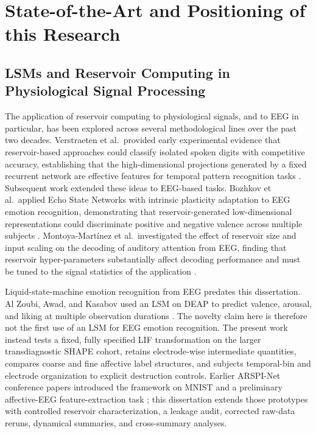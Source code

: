 \section{State-of-the-Art and Positioning of this Research}
\label{sec:state_of_art}

\subsection{LSMs and Reservoir Computing in Physiological Signal Processing}
\label{sec:lsm_literature}
The application of reservoir computing to physiological signals, and to EEG in particular, has been explored across several methodological lines over the past two decades. Verstraeten et al.\ provided early experimental evidence that reservoir-based approaches could classify isolated spoken digits with competitive accuracy, establishing that the high-dimensional projections generated by a fixed recurrent network are effective features for temporal pattern recognition tasks \cite{verstraeten_experimental_2007}. Subsequent work extended these ideas to EEG-based tasks. Bozhkov et al.\ applied Echo State Networks with intrinsic plasticity adaptation to EEG emotion recognition, demonstrating that reservoir-generated low-dimensional representations could discriminate positive and negative valence across multiple subjects \cite{bozhkov_reservoir_2017}. Montoya-Mart\'{i}nez et al.\ investigated the effect of reservoir size and input scaling on the decoding of auditory attention from EEG, finding that reservoir hyper-parameters substantially affect decoding performance and must be tuned to the signal statistics of the application \cite{montoya-martinez_effect_2021}.

Liquid-state-machine emotion recognition from EEG predates this dissertation. Al Zoubi, Awad, and Kasabov used an LSM on DEAP to predict valence, arousal, and liking at multiple observation durations \cite{alzoubi_lsm_eeg_2018}. The novelty claim here is therefore not the first use of an LSM for EEG emotion recognition. The present work instead tests a fixed, fully specified LIF transformation on the larger transdiagnostic SHAPE cohort, retains electrode-wise intermediate quantities, compares coarse and fine affective label structures, and subjects temporal-bin and electrode organization to explicit destruction controls. Earlier ARSPI-Net conference papers introduced the framework on MNIST and a preliminary affective-EEG feature-extraction task \cite{lane_arspinet_2023,lane_arspi_2024}; this dissertation extends those prototypes with controlled reservoir characterization, a leakage audit, corrected raw-data reruns, dynamical summaries, and cross-summary analyses.


